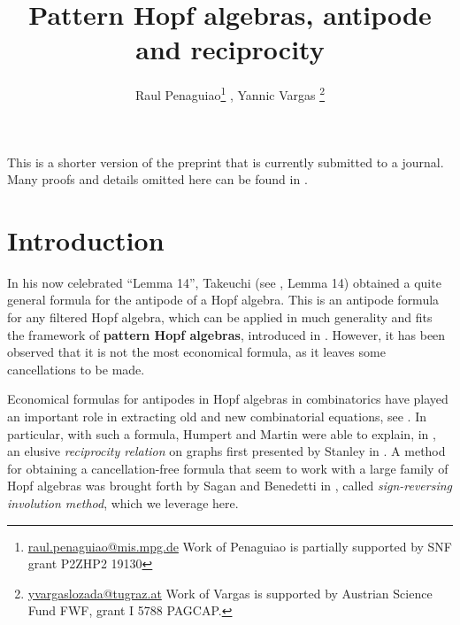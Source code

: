 \documentclass[submission]{FPSAC2023}
\title[Pattern Hopf algebras, antipode and reciprocity]{Pattern Hopf algebras, antipode and reciprocity}
\author[R. Penaguiao, Y. Vargas]{Raul Penaguiao\thanks{\href{mailto:raul.penaguiao@mis.mpg.de}{raul.penaguiao@mis.mpg.de} Work of Penaguiao is partially supported by SNF grant P2ZHP2
19130} \addressmark{1}, Yannic Vargas \thanks{\href{mailto:yvargaslozada@tugraz.at}{yvargaslozada@tugraz.at} Work of Vargas is supported by  Austrian Science Fund FWF, grant I 5788 PAGCAP.} \addressmark{2}}
\theoremstyle{definition}
\begin{document}
\maketitle


This is a shorter version of the preprint \cite{PV2022} that is currently submitted to a journal. Many proofs and details omitted here can be found in \cite{PV2022}.

\section{Introduction}
In his now celebrated  ``Lemma 14'', Takeuchi (see \cite{Takeuchi1971}, Lemma 14) obtained a quite general formula for the antipode of a Hopf algebra. 
This is an antipode formula for any filtered Hopf algebra, which can be applied in much generality and fits the framework of \textbf{pattern Hopf algebras}, introduced in \cite{Penaguiao2020}.
However, it has been observed that it is not the most economical formula, as it leaves some cancellations to be made.


Economical formulas for antipodes in Hopf algebras in combinatorics have played an important role in extracting old and new combinatorial equations, see \cite{aguiar2017hopf, BS2017, humpert2012incidence, Schmitt1993, xu2022cancellation}.
In particular, with such a formula, Humpert and Martin were able to explain, in \cite{humpert2012incidence}, an elusive \textit{reciprocity relation} on graphs first presented by Stanley in \cite{stanley1975combinatorial}.
A method for obtaining a cancellation-free formula that seem to work with a large family of Hopf algebras was brought forth by Sagan and Benedetti in \cite{BS2017}, called \textit{sign-reversing involution method}, which we leverage here.
\end{document}
